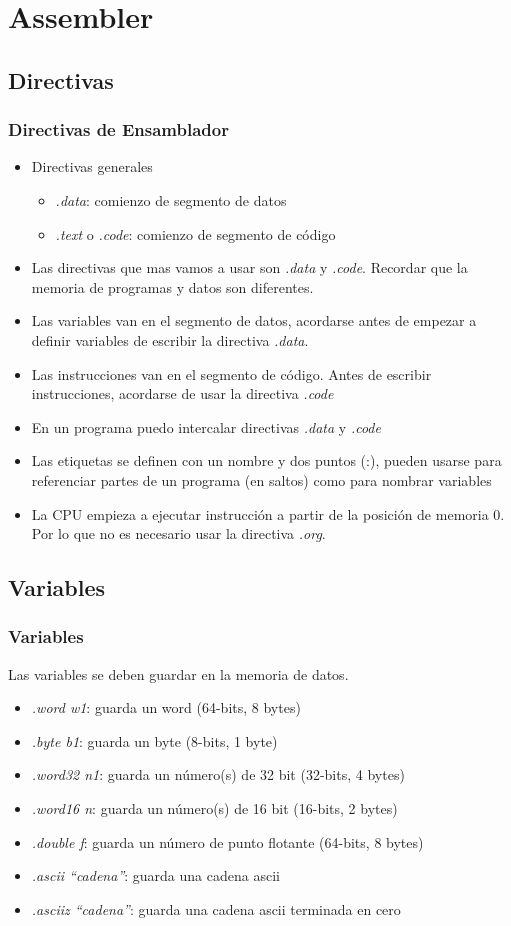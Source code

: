 \documentclass{beamer}
\begin{document}
\section{Assembler}
\subsection{Directivas}
\begin{frame}
\frametitle{Directivas de Ensamblador}
\begin{itemize}
\item Directivas generales
\begin{itemize}
\item \emph{.data}: comienzo de segmento de datos
\item \emph{.text} o \emph{.code}: comienzo de segmento de código
\end{itemize}
\item Las directivas que mas vamos a usar son \emph{.data} y \emph{.code}. Recordar que la memoria de programas y datos son diferentes.
\item Las variables van en el segmento de datos, acordarse antes de empezar a definir variables de escribir la directiva \emph{.data}.
\item Las instrucciones van en el segmento de código. Antes de escribir instrucciones, acordarse de usar la directiva \emph{.code}
\item En un programa puedo intercalar directivas \emph{.data} y \emph{.code}
\item Las etiquetas se definen con un nombre y dos puntos (:), pueden usarse para referenciar partes de un programa (en saltos) como para nombrar variables
\item La CPU empieza a ejecutar instrucción a partir de la posición de memoria 0. Por lo que no es necesario usar la directiva \emph{.org}.
\end{itemize}
\end{frame}

\subsection{Variables}
\begin{frame}
\frametitle{Variables}
Las variables se deben guardar en la memoria de datos.
\begin{itemize}
\item \emph{.word w1}: guarda un word (64-bits, 8 bytes)
\item \emph{.byte b1}: guarda un byte (8-bits, 1 byte)
\item \emph{.word32 n1}: guarda un número(s) de 32 bit (32-bits, 4 bytes)
\item \emph{.word16 n}: guarda un número(s) de 16 bit (16-bits, 2 bytes)
\item \emph{.double f}: guarda un número de punto flotante (64-bits, 8 bytes)
\item \emph{.ascii ``cadena''}: guarda una cadena  ascii
\item \emph{.asciiz ``cadena''}:  guarda una cadena ascii terminada en cero
\end{itemize}
\end{frame}
\end{document}
